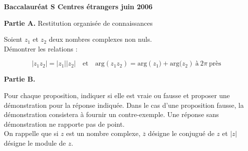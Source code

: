 \begin{exercice}
{\large \textbf{Baccalaur\'eat S Centres \'etrangers juin 2006}}
 
%

\noindent \textbf{Partie A.} Restitution organis\'ee de connaissances\\

\noindent Soient $z_{1}$ et $z_{2}$ deux nombres complexes non nuls.\\
D\'emontrer les relations :

\[\left|z_{1}z_{2}\right|  = \left|z_{1}\right|\left|z_{2}\right|\quad\text{et}\quad \text{arg}\left(z_{1}z_{2}\right) = \text{arg}\left(z_{1}) + \text{arg}(z_{2}\right)~\text{\`a}~2\pi~\text{pr\`es}\]

\medskip

\noindent \textbf{Partie B.}

\noindent  Pour chaque proposition, indiquer si elle est vraie ou fausse et proposer une d\'emonstration pour la r\'eponse indiqu\'ee. Dans le cas d'une proposition fausse, la d\'emonstration consistera \`a fournir un contre-exemple. Une r\'eponse sans d\'emonstration ne rapporte pas de point.\\
On rappelle que si $z$ est un nombre complexe, $\overline{z}$ d\'esigne le conjugu\'e de $z$ et $|z|$ d\'esigne le module de $z$.


\end{exercice}
